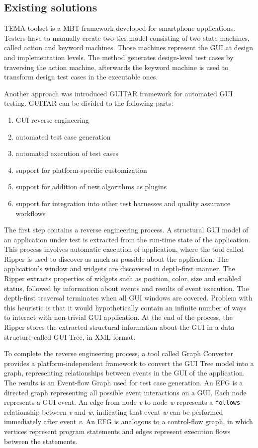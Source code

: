 \subsection{Existing solutions}
TEMA toolset is a MBT framework developed for smartphone applications. Testers have to manually create two-tier model consisting of two state machines, called action and keyword machines. Those machines represent the GUI at design and implementation levels. The method generates design-level test cases by traversing the action machine, afterwards the keyword machine is used to transform design test cases in the executable ones.\cite{TEMA}

Another approach was introduced GUITAR\cite{NguyenBao2014Gait} framework for automated GUI testing. GUITAR can be divided to the following parts:
\begin{enumerate}
    \item GUI reverse engineering
    \item automated test case generation
    \item automated execution of test cases
    \item support for platform-specific customization
    \item support for addition of new algorithms as plugins
    \item support for integration into other test harnesses and quality assurance workflows
\end{enumerate}

The first step contains a reverse engineering process. A structural GUI model of an application under test is extracted from the run-time state of the application. This process involves automatic execution of application, where the tool called Ripper is used to discover as much as possible about the application. The application's window and widgets are discovered in depth-first manner. The Ripper extracts properties of widgets such as position, color, size and enabled status, followed by information about events and results of event execution. The depth-first traversal terminates when all GUI windows are covered. Problem with this heuristic is that it would hypothetically contain an infinite number of ways to interact with non-trivial GUI application. At the end of the process, the Ripper stores the extracted structural information about the GUI in a data structure called GUI Tree, in XML format.

To complete the reverse engineering process, a tool called Graph Converter provides a platform-independent framework to convert the GUI Tree model into a graph, representing relationships between events in the GUI of the application. The results is an Event-flow Graph used for test case generation.
An EFG is a directed graph representing all possible event interactions on a GUI. Each node represents a GUI event. An edge from node \textit{v} to node \textit{w} represents a \verb|follows| relationship between \textit{v} and \textit{w}, indicating that event \textit{w} can be performed immediately after event \textit{v}.  An EFG is analogous to a control-flow graph, in which vertices represent program statements and edges represent execution flows between the statements.

